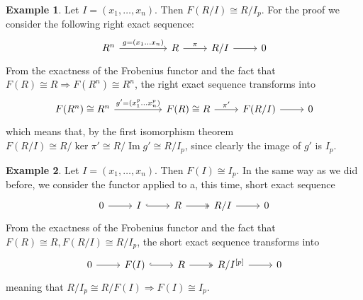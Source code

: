 \documentclass[leqno]{article}
\theoremstyle{definition}
\newtheorem{example}{Example}[section]
\DeclareMathOperator{\im}{Im}
\begin{document}
\begin{example} Let $I = (x_1, \ldots, x_n)$. Then $F(R / I) \cong R / I _{p}$. For the proof we consider the following right exact sequence:
\[\begin{tikzcd}
	{R^n} && R & {R/I} & 0
	\arrow["\pi", from=1-3, to=1-4]
	\arrow[from=1-4, to=1-5]
	\arrow["{g = (x_1 \ldots x_n)}", from=1-1, to=1-3]
\end{tikzcd}\]
 From the exactness of the Frobenius functor and the fact that $F(R)\cong R \Rightarrow F(R^n)\cong R^n$, the right exact sequence transforms into
\[\begin{tikzcd}
	{F(R^n)\cong R^n} && {F(R)\cong R} & {F(R/I)} & 0
	\arrow["{\pi'}", from=1-3, to=1-4]
	\arrow[from=1-4, to=1-5]
	\arrow["{g' = (x_1^p \ldots x_n^p)}", from=1-1, to=1-3]
\end{tikzcd}\]
which means that, by the first isomorphism theorem $F(R / I) \cong R / \ker \pi' \cong R / \im g' \cong R / I_{p} $, since clearly the image of $g'$ is  $I _{p}$.
\end{example}


\begin{example} Let $I = (x_1, \ldots, x_n)$. Then $F(I) \cong I _{p}$. In the same way as we did before, we consider the functor applied to a, this time, short exact sequence
\[\begin{tikzcd}
	0 & I & R & {R/I} & 0
	\arrow[from=1-1, to=1-2]
	\arrow[hook, from=1-2, to=1-3]
	\arrow[two heads, from=1-3, to=1-4]
	\arrow[from=1-4, to=1-5]
\end{tikzcd}\]
From the exactness of the Frobenius functor and the fact that $F(R)\cong R, F(R / I) \cong R / I _{p}$, the short exact sequence transforms into
\[\begin{tikzcd}
	0 & {F(I)} & R & {R/I^{[p]}} & 0
	\arrow[from=1-1, to=1-2]
	\arrow[hook, from=1-2, to=1-3]
	\arrow[two heads, from=1-3, to=1-4]
	\arrow[from=1-4, to=1-5]
\end{tikzcd}\]
meaning that $R / I _{p} \cong R / F(I) \Rightarrow F(I)\cong I _{p}$.
\end{example}
\end{document}
